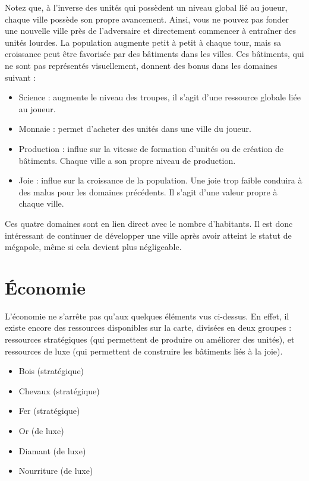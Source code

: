 \documentclass[12pt]{report}
\begin{document}
Notez que, à l’inverse des unités qui possèdent un niveau global lié au joueur,
chaque ville possède son propre avancement. Ainsi, vous ne pouvez pas fonder une
nouvelle ville près de l’adversaire et directement commencer à entraîner des
unités lourdes. La population augmente petit à petit à chaque tour, mais sa
croissance peut être favorisée par des bâtiments dans les villes. Ces bâtiments,
qui ne sont pas représentés visuellement, donnent des bonus dans les domaines
suivant :

\begin{itemize}
    \item Science : augmente le niveau des troupes, il s’agit d’une ressource
        globale liée au joueur.
    \item Monnaie : permet d’acheter des unités dans une ville du joueur.
    \item Production : influe sur la vitesse de formation d’unités ou de
        création de bâtiments. Chaque ville a son propre niveau de production.
    \item Joie : influe sur la croissance de la population. Une joie trop faible
        conduira à des malus pour les domaines précédents. Il s’agit d’une
        valeur propre à chaque ville.
\end{itemize}

Ces quatre domaines sont en lien direct avec le nombre d’habitants. Il est donc
intéressant de continuer de développer une ville après avoir atteint le statut
de mégapole, même si cela devient plus négligeable.

\section{Économie}

L’économie ne s’arrête pas qu’aux quelques éléments vus ci-dessus. En effet, il
existe encore des ressources disponibles sur la carte, divisées en deux groupes
: ressources stratégiques (qui permettent de produire ou améliorer des unités),
et ressources de luxe (qui permettent de construire les bâtiments liés à la
joie).

\begin{itemize}
    \item Bois (stratégique)
    \item Chevaux (stratégique)
    \item Fer (stratégique)
    \item Or (de luxe)
    \item Diamant (de luxe)
    \item Nourriture (de luxe)
\end{itemize}
\end{document}

